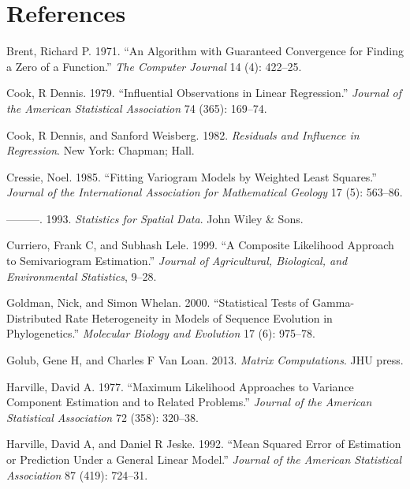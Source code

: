 \documentclass{article}
\begin{document}
\hypertarget{references}{%
\section*{References}\label{references}}

\hypertarget{refs}{}
\leavevmode\hypertarget{ref-brent1971algorithm}{}%
Brent, Richard P. 1971. ``An Algorithm with Guaranteed Convergence for
Finding a Zero of a Function.'' \emph{The Computer Journal} 14 (4):
422--25.

\leavevmode\hypertarget{ref-cook1979influential}{}%
Cook, R Dennis. 1979. ``Influential Observations in Linear Regression.''
\emph{Journal of the American Statistical Association} 74 (365):
169--74.

\leavevmode\hypertarget{ref-cook1982residuals}{}%
Cook, R Dennis, and Sanford Weisberg. 1982. \emph{Residuals and
Influence in Regression}. New York: Chapman; Hall.

\leavevmode\hypertarget{ref-cressie1985fitting}{}%
Cressie, Noel. 1985. ``Fitting Variogram Models by Weighted Least
Squares.'' \emph{Journal of the International Association for
Mathematical Geology} 17 (5): 563--86.

\leavevmode\hypertarget{ref-cressie1993statistics}{}%
---------. 1993. \emph{Statistics for Spatial Data}. John Wiley \& Sons.

\leavevmode\hypertarget{ref-curriero1999composite}{}%
Curriero, Frank C, and Subhash Lele. 1999. ``A Composite Likelihood
Approach to Semivariogram Estimation.'' \emph{Journal of Agricultural,
Biological, and Environmental Statistics}, 9--28.

\leavevmode\hypertarget{ref-goldman2000statistical}{}%
Goldman, Nick, and Simon Whelan. 2000. ``Statistical Tests of
Gamma-Distributed Rate Heterogeneity in Models of Sequence Evolution in
Phylogenetics.'' \emph{Molecular Biology and Evolution} 17 (6): 975--78.

\leavevmode\hypertarget{ref-golub2013matrix}{}%
Golub, Gene H, and Charles F Van Loan. 2013. \emph{Matrix Computations}.
JHU press.

\leavevmode\hypertarget{ref-harville1977maximum}{}%
Harville, David A. 1977. ``Maximum Likelihood Approaches to Variance
Component Estimation and to Related Problems.'' \emph{Journal of the
American Statistical Association} 72 (358): 320--38.

\leavevmode\hypertarget{ref-harville1992mean}{}%
Harville, David A, and Daniel R Jeske. 1992. ``Mean Squared Error of
Estimation or Prediction Under a General Linear Model.'' \emph{Journal
of the American Statistical Association} 87 (419): 724--31.
\end{document}
